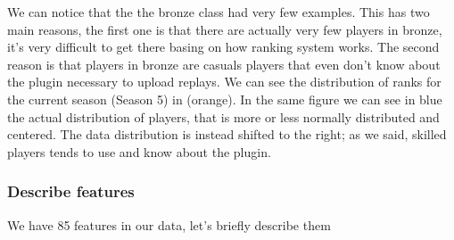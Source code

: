 We can notice that the the bronze class had very few examples. This has two main reasons, the first one is that there are actually very few players in bronze, it's very difficult to get there basing on how ranking system works. The second reason is that players in bronze are casuals players that even don't know about the plugin necessary to upload replays. We can see the distribution of ranks for the current season (Season 5) in  (orange). In the same figure we can see in blue the actual distribution of players, that is more or less normally distributed and centered. The data distribution is instead shifted to the right; as we said, skilled players tends to use and know about the plugin.

\subsubsection{Describe features}
We have 85 features in our data, let's briefly describe them


